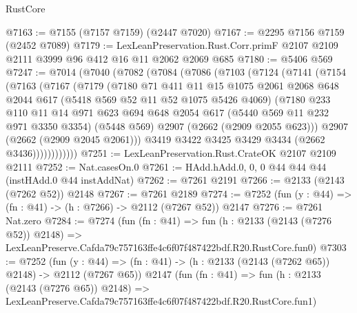 \begin{lexlean}{RustCore}
\begin{coremodule}
@7163 := @7155 (@7157 @7159) (@2447 @7020)
@7167 := @2295 @7156 @7159 (@2452 @7089)
@7179 := LexLeanPreservation.Rust.Corr.primF
    @2107
    @2109
    @2111
    @3999
    @96
    @412
    @16
    @11
    @2062
    @2069
    @685
@7180 := @5406 @569
@7247 := @7014
    (@7040
      (@7082
        (@7084
          (@7086
            (@7103
              (@7124
                (@7141
                  (@7154
                    (@7163
                      (@7167
                        (@7179
                          (@7180
                            @71
                            @411
                            @11
                            @15
                            @1075
                            @2061
                            @2068
                            @648
                            @2044
                            @617
                            (@5418 @569 @52 @11 @52 @1075 @5426 @4069)
                            (@7180
                              @233
                              @110
                              @11
                              @14
                              @971
                              @623
                              @694
                              @648
                              @2054
                              @617
                              (@5440 @569 @11 @232 @971 @3350 @3354)
                              (@5448 @569)
                              @2907
                              (@2662 (@2909 @2055 @623)))
                            @2907
                            (@2662 (@2909 @2045 @2061)))
                          @3419
                          @3422
                          @3425
                          @3429
                          @3434
                          (@2662 @3436))))))))))))
@7251 := LexLeanPreservation.Rust.CrateOK @2107 @2109 @2111
@7252 := Nat.casesOn.{0}
@7261 := HAdd.hAdd.{0, 0, 0} @44 @44 @44 (instHAdd.{0} @44 instAddNat)
@7262 := @7261 @2191
@7266 := @2133 (@2143 (@7262 @52)) @2148
@7267 := @7261 @2189
@7274 := @7252 (fun (y : @44) => (fn : @41) -> (h : @7266) -> @2112 (@7267 @52)) @2147
@7276 := @7261 Nat.zero
@7284 := @7274
    (fun (fn : @41) =>
    fun (h : @2133 (@2143 (@7276 @52)) @2148) =>
    LexLeanPreserve.Cafda79c757163ffe4c6f07f487422bdf.R20.RustCore.fun0)
@7303 := @7252
    (fun (y : @44) => (fn : @41) -> (h : @2133 (@2143 (@7262 @65)) @2148) -> @2112 (@7267 @65))
    @2147
    (fun (fn : @41) =>
    fun (h : @2133 (@2143 (@7276 @65)) @2148) =>
    LexLeanPreserve.Cafda79c757163ffe4c6f07f487422bdf.R20.RustCore.fun1)

\end{coremodule}
\end{lexlean}
